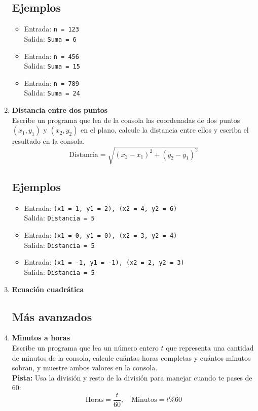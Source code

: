 \begin{enumerate}
    \subsection*{Ejemplos}
    \begin{itemize}
        \item Entrada: \texttt{n = 123}\\
              Salida: \texttt{Suma = 6}
        \item Entrada: \texttt{n = 456}\\
              Salida: \texttt{Suma = 15}
        \item Entrada: \texttt{n = 789}\\
              Salida: \texttt{Suma = 24}
    \end{itemize}
    
    \item \textbf{Distancia entre dos puntos}\\
    Escribe un programa que lea de la consola las coordenadas de dos puntos \( (x_1, y_1) \) y \( (x_2, y_2) \) en el plano, calcule la distancia entre ellos y escriba el resultado en la consola.\\
    \[
    \text{Distancia} = \sqrt{(x_2 - x_1)^2 + (y_2 - y_1)^2}
    \]
    \subsection*{Ejemplos}
    \begin{itemize}
        \item Entrada: \texttt{(x1 = 1, y1 = 2), (x2 = 4, y2 = 6)}\\
              Salida: \texttt{Distancia = 5}
        \item Entrada: \texttt{(x1 = 0, y1 = 0), (x2 = 3, y2 = 4)}\\
              Salida: \texttt{Distancia = 5}
        \item Entrada: \texttt{(x1 = -1, y1 = -1), (x2 = 2, y2 = 3)}\\
              Salida: \texttt{Distancia = 5}
    \end{itemize}

    \item \textbf{Ecuación cuadrática}\\
    

\subsection*{Más avanzados}
    \item \textbf{Minutos a horas}\\
    Escribe un programa que lea un número entero \(t\) que representa una cantidad de minutos de la consola, calcule cuántas horas completas y cuántos minutos sobran, y muestre ambos valores en la consola.\\
    \textbf{Pista:} Usa la división y resto de la división para manejar cuando te pases de 60:
    \[
    \text{Horas} = \frac{t}{60}, \quad \text{Minutos} = t \% 60
    \]

\end{enumerate}
